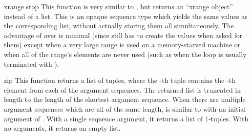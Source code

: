 \begin{funcdesc}{xrange}{ stop}
  This function is very similar to , but returns an
  ``xrange object'' instead of a list.  This is an opaque sequence
  type which yields the same values as the corresponding list, without
  actually storing them all simultaneously.  The advantage of
   over  is minimal (since
   still has to create the values when asked for
  them) except when a very large range is used on a memory-starved
  machine or when all of the range's elements are never used (such as
  when the loop is usually terminated with ).
\end{funcdesc}

\begin{funcdesc}{zip}{}
  This function returns a list of tuples, where the -th tuple contains
  the -th element from each of the argument sequences.
  The returned list is truncated in length to the length of
  the shortest argument sequence.  When there are multiple argument
  sequences which are all of the same length,  is
  similar to  with an initial argument of .
  With a single sequence argument, it returns a list of 1-tuples.
  With no arguments, it returns an empty list.

\end{funcdesc}
